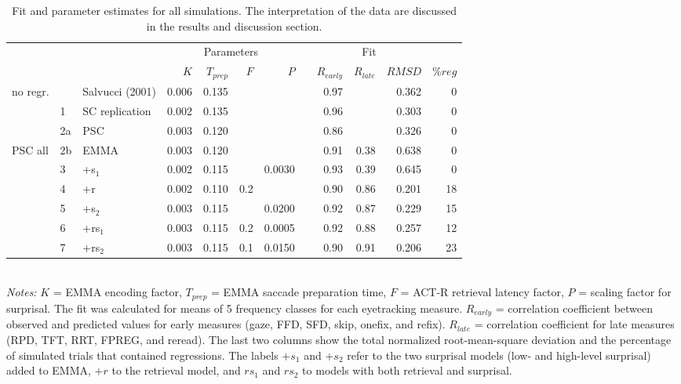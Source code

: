 \documentclass{cambridge7A}\usepackage[]{graphicx}\usepackage[]{color}
\begin{document}
\begin{table}
\centering
\begin{tabular}{lllrrrrrrrrr}
\hline
 & & & \multicolumn{4}{c}{Parameters} & & \multicolumn{3}{c}{Fit} & \\ \cline{4-7} \cline{9-11}
  &   &   & $K$ & $T_{prep}$ & $F$ & $P$ &   & $R_{early}$ & $R_{late}$ & $RMSD$ & $\%reg$ \\ 
 \hline
no regr. &  & Salvucci (2001) & 0.006 & 0.135 &  &  &  & 0.97 &  & 0.362 & 0 \\ 
   & 1 & SC replication & 0.002 & 0.135 &  &  &  & 0.96 &  & 0.303 & 0 \\ 
   & 2a & PSC & 0.003 & 0.120 &  &  &  & 0.86 &  & 0.326 & 0 \\ 
 \hline
PSC all & 2b & EMMA & 0.003 & 0.120 &  &  &  & 0.91 & 0.38 & 0.638 & 0 \\ 
   & 3 & +s$_1$ & 0.002 & 0.115 &  & 0.0030 &  & 0.93 & 0.39 & 0.645 & 0 \\ 
   & 4 & +r & 0.002 & 0.110 & 0.2 &  &  & 0.90 & 0.86 & 0.201 & 18 \\ 
   & 5 & +s$_2$ & 0.003 & 0.115 &  & 0.0200 &  & 0.92 & 0.87 & 0.229 & 15 \\ 
   & 6 & +rs$_1$ & 0.003 & 0.115 & 0.2 & 0.0005 &  & 0.92 & 0.88 & 0.257 & 12 \\ 
   & 7 & +rs$_2$ & 0.003 & 0.115 & 0.1 & 0.0150 &  & 0.90 & 0.91 & 0.206 & 23 \\
 \hline 
\end{tabular} \\ 
\footnotesize{
\emph{Notes:} $K$ = EMMA encoding factor, $T_{prep}$ = EMMA saccade preparation time, $F$ = ACT-R retrieval latency factor, $P$ = scaling factor for surprisal. The fit was calculated for means of 5 frequency classes for each eyetracking measure. $R_{early}$ = correlation coefficient between observed and predicted values for early measures (gaze, FFD, SFD, skip, onefix, and refix). $R_{late}$ = correlation coefficient for late measures (RPD, TFT, RRT, FPREG, and reread). The last two columns show the total normalized root-mean-square deviation and the percentage of simulated trials that contained regressions. The labels $+s_1$ and $+s_2$ refer to the two surprisal models (low- and high-level surprisal) added to EMMA, $+r$ to the retrieval model, and $rs_1$ and $rs_2$ to models with both retrieval and surprisal.}
\caption{Fit and parameter estimates for all simulations. The interpretation of the data are discussed in the results and discussion section.}\label{simtable}
\end{table}
\end{document}
